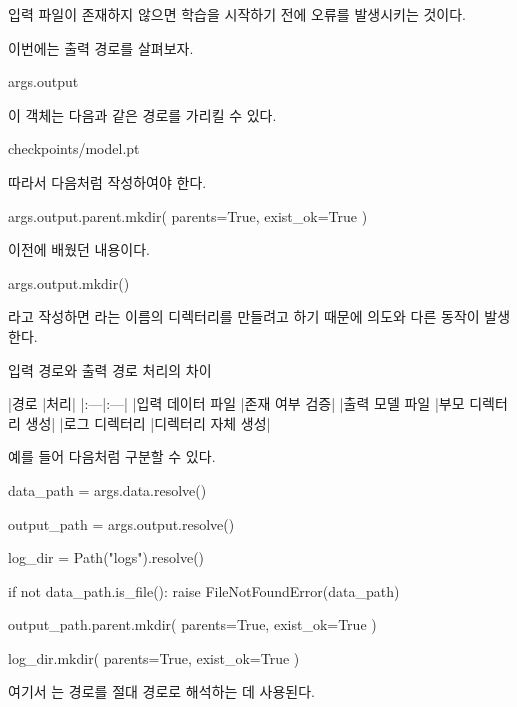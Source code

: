 입력 파일이 존재하지 않으면 학습을 시작하기 전에 오류를 발생시키는 것이다.

이번에는 출력 경로를 살펴보자.

\begin{dhkzsh}
args.output
\end{dhkzsh}

이 객체는 다음과 같은 경로를 가리킬 수 있다.

\begin{dhkzsh}
checkpoints/model.pt
\end{dhkzsh}

따라서 다음처럼 작성하여야 한다.

\begin{dhkcode}
args.output.parent.mkdir(
    parents=True,
    exist_ok=True
)
\end{dhkcode}

이전에 배웠던 내용이다.

\begin{dhkcode}
args.output.mkdir()
\end{dhkcode}

라고 작성하면 라는 이름의 디렉터리를 만들려고 하기 때문에 의도와 다른 동작이 발생한다.

\begin{dhknote}
\begin{dhksmry}[centered]
입력 경로와 출력 경로 처리의 차이
\end{dhksmry}
\end{dhknote}

\begin{dhktable}
|경로	|처리|
|:---|:---|
|입력 데이터 파일	|존재 여부 검증|
|출력 모델 파일	|부모 디렉터리 생성|
|로그 디렉터리	|디렉터리 자체 생성|
\end{dhktable}

예를 들어 다음처럼 구분할 수 있다.

\begin{dhkcode}
data_path = args.data.resolve()

output_path = args.output.resolve()

log_dir = Path("logs").resolve()

if not data_path.is_file():
    raise FileNotFoundError(data_path)

output_path.parent.mkdir(
    parents=True,
    exist_ok=True
)

log_dir.mkdir(
    parents=True,
    exist_ok=True
)
\end{dhkcode}

여기서 는 경로를 절대 경로로 해석하는 데 사용된다.

